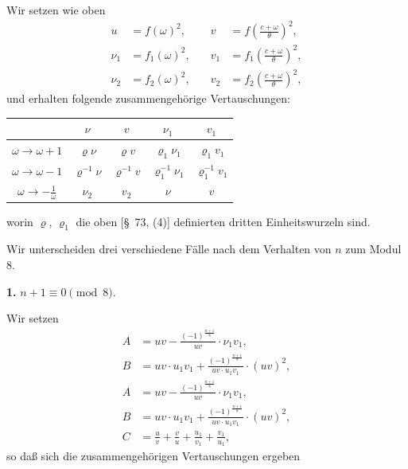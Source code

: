 \documentclass[12pt,a4paper]{article}
\theoremstyle{definition}
\begin{document}
Wir setzen wie oben
\begin{equation}\label{eq:75-1}
\begin{aligned}
u &= f(\omega)^2, &\quad v &= f\left(\frac{c + \omega}{\theta}\right)^2, \\
\nu_1 &= f_1(\omega)^2, &\quad v_1 &= f_1\left(\frac{c + \omega}{\theta}\right)^2, \\
\nu_2 &= f_2(\omega)^2, &\quad v_2 &= f_2\left(\frac{c + \omega}{\theta}\right)^2,
\end{aligned}
\end{equation}
und erhalten folgende zusammengehörige Vertauschungen:

\begin{center}
\begin{tabular}{c|cccc}
& $\nu$ & $v$ & $\nu_1$ & $v_1$ \\
\midrule
$\omega \to \omega + 1$ & $\varrho \nu$ & $\varrho v$ & $\varrho_1 \nu_1$ & $\varrho_1 v_1$ \\
$\omega \to \omega - 1$ & $\varrho^{-1} \nu$ & $\varrho^{-1} v$ & $\varrho_1^{-1} \nu_1$ & $\varrho_1^{-1} v_1$ \\
$\omega \to -\frac{1}{\omega}$ & $\nu_2$ & $v_2$ & $\nu$ & $v$ \\
\end{tabular}
\end{center}
worin $\varrho$, $\varrho_1$ die oben [\S\ 73, (4)] definierten dritten Einheitswurzeln sind.

Wir unterscheiden drei verschiedene Fälle nach dem Verhalten von $n$ zum Modul 8.

\textbf{1.} $n + 1 \equiv 0 \pmod{8}$.

Wir setzen
\[
\begin{aligned}
A &= uv - \frac{(-1)^{\frac{n+1}{8}}}{uv} \cdot \nu_1 v_1, \\
B &= uv \cdot u_1 v_1 + \frac{(-1)^{\frac{n+1}{8}}}{uv \cdot u_1 v_1} \cdot (uv)^2,
\end{aligned}
\]
\begin{equation}\label{eq:75-3}
\begin{aligned}
A &= uv - \frac{(-1)^{\frac{n+1}{8}}}{uv} \cdot \nu_1 v_1, \\
B &= uv \cdot u_1 v_1 + \frac{(-1)^{\frac{n+1}{8}}}{uv \cdot u_1 v_1} \cdot (uv)^2, \\
C &= \frac{u}{v} + \frac{v}{u} + \frac{u_1}{v_1} + \frac{v_1}{u_1},
\end{aligned}
\end{equation}
so daß sich die zusammengehörigen Vertauschungen ergeben
\end{document}
